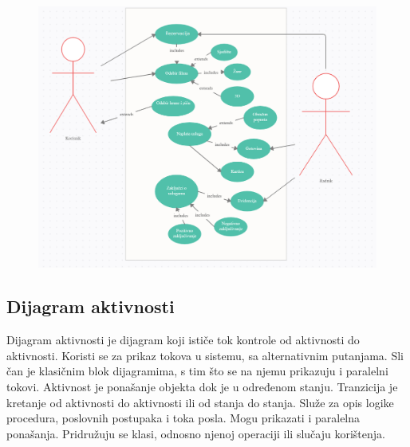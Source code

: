 \documentclass[12pt,table,xcdraw]{article}
\begin{document}
\begin{figure}[h]
\centering
\captionsetup{justification=centering}
\includegraphics[width=0.85\columnwidth]{slike/slika4.png}
\label{fig:kod}
\end{figure}



\subsection{Dijagram aktivnosti}

Dijagram aktivnosti je dijagram koji ističe tok kontrole od aktivnosti do aktivnosti. Koristi se za prikaz tokova u sistemu, sa alternativnim putanjama. Sli
čan je klasičnim blok dijagramima, s tim što se na njemu prikazuju i paralelni tokovi. Aktivnost je ponašanje objekta dok je u određenom stanju. Tranzicija je kretanje od aktivnosti do aktivnosti ili od stanja do stanja. Služe za opis logike procedura, poslovnih postupaka i toka posla. Mogu prikazati i paralelna ponašanja. Pridružuju se klasi, odnosno njenoj operaciji ili slučaju korištenja.
\newpage
\end{document}
